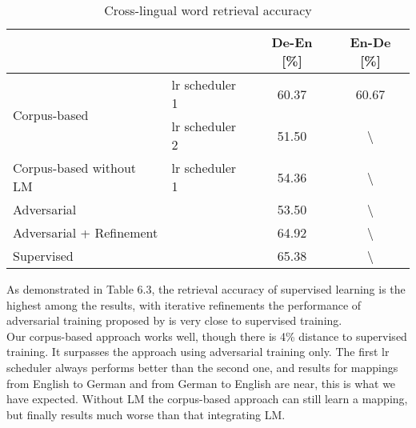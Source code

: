 \begin{table}[H]
	\centering
	\begin{tabular}{llcc}
		\hline
		&                & De-En [\%]& En-De [\%]            \\ \hline
		\multirow{2}{*}{Corpus-based } & lr scheduler 1 & 60.37 & 60.67            \\ \cline{2-4} 
		& lr scheduler 2 & 51.50 & \textbackslash{} \\ \hline
		Corpus-based without LM              & lr scheduler 1 & 54.36 &        \textbackslash{}           \\ \hline
		Adversarial                            &                & 53.50 &       \textbackslash{}   \\ \hline
		Adversarial + Refinement               &                & 64.92 & \textbackslash{}    \\ \hline
		Supervised                             &                & 65.38 & \textbackslash{}  \\ \hline
	\end{tabular}
	\caption{Cross-lingual word retrieval accuracy}
\end{table}
As demonstrated in Table 6.3, the retrieval accuracy of supervised learning is the highest among the results, with iterative refinements the performance of adversarial training proposed by \cite{DBLP:journals/corr/abs-1710-04087} is very close to supervised training. \\
Our corpus-based approach works well, though there is 4\% distance to supervised training. It surpasses the approach using adversarial training only. The first lr scheduler always performs better than the second one, and results for mappings from English to German and from German to English are near, this is what we have expected.  Without LM the corpus-based approach can still learn a mapping, but finally results much worse than that integrating LM.\\

